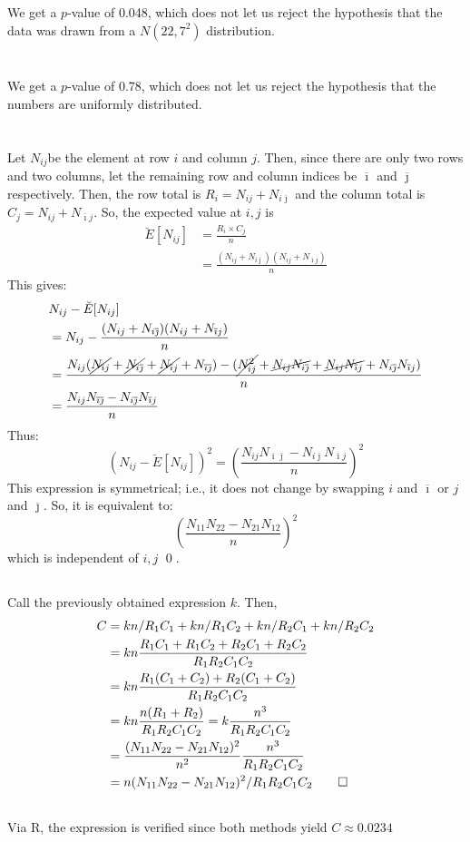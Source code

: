 \documentclass[twocolumn]{article}
\newcommand{\setsection}[1]{\setcounter{section}{#1}\addtocounter{section}{-1}\section{}}
\newcommand{\nsub}[2]{N_{#1 #2}}
\newcommand{\ovi}{\ensuremath{\overline{\imath}}}
\newcommand{\ovj}{\ensuremath{\overline{\jmath}}}
\newcommand{\na}{\ensuremath{\nsub{i}{j}}}
\newcommand{\nb}{\ensuremath{\nsub{i}{\ovj}}}
\newcommand{\nc}{\ensuremath{\nsub{\ovi}{j}}}
\newcommand{\nd}{\ensuremath{\nsub{\ovi}{\ovj}}}
\newcommand{\sumr}{\ensuremath{\na+\nb}}
\newcommand{\sumc}{\ensuremath{\na+\nc}}
\newcommand{\sums}{\ensuremath{n}}
\begin{document}
\subsection{}

We get a $p$-value of 0.048, which does not let us reject the hypothesis that the data was drawn from a $N(22,7^2)$ distribution.

\setsection{25}

We get a $p$-value of 0.78, which does not let us reject the hypothesis that the numbers are uniformly distributed.

\setsection{29}

\subsection{}

Let \na be the element at row $i$ and column $j$. Then, since there are only two rows and two columns, let the remaining row and column indices be \ovi{} and \ovj{} respectively.
Then, the row total is $R_i=\sumr$ and the column total is $C_j=\sumc$. So, the expected value at $i,j$ is\begin{align*}
\breve{E}[\na]
&=\frac{R_i\times C_j}{\sums}	\\
&=\frac{(\sumr)(\sumc)}{\sums}
\end{align*}
This gives:\begin{align*}
&\na-\breve{E}[\na]\\
&=\na-\frac{(\sumr)(\sumc)}{\sums}\\
&=\frac{\na(\cancel{\na}+\cancel{\nb}+\cancel{\nc}+\nd)-(\cancel{\na^2}+\cancel{\na\nb}+\cancel{\na\nc}+\nb\nc)}{\sums}\\
&=\frac{\na\nd-\nb\nc}{\sums}\\
\end{align*}
Thus:\[
(\na-\breve{E}[\na])^2=\left(\frac{\na\nd-\nb\nc}{\sums}\right)^2
\]
This expression is symmetrical; i.e., it does not change by swapping $i$ and \ovi{} or $j$ and \ovj{}. So, it is equivalent to:\[
\left(\frac{N_{11}N_{22}-N_{21}N_{12}}{n}\right)^2
\]
which is independent of $i,j$ \qed.

\subsection{}

Call the previously obtained expression $k$. Then, \begin{align*}
C
&=kn/R_1C_1+kn/R_1C_2+kn/R_2C_1+kn/R_2C_2\\
&=kn\frac{R_1C_1+R_1C_2+R_2C_1+R_2C_2}{R_1R_2C_1C_2}\\
&=kn\frac{R_1(C_1+C_2)+R_2(C_1+C_2)}{R_1R_2C_1C_2}\\
&=kn\frac{n(R_1+R_2)}{R_1R_2C_1C_2}=k\frac{n^3}{R_1R_2C_1C_2}\\
&=\frac{(N_{11}N_{22}-N_{21}N_{12})^2}{n^2}\frac{n^3}{R_1R_2C_1C_2}\\
&=n(N_{11}N_{22}-N_{21}N_{12})^2/R_1R_2C_1C_2\qed
\end{align*}

\subsection{}
Via R, the expression is verified since both methods yield $C\approx0.0234$
\end{document}
